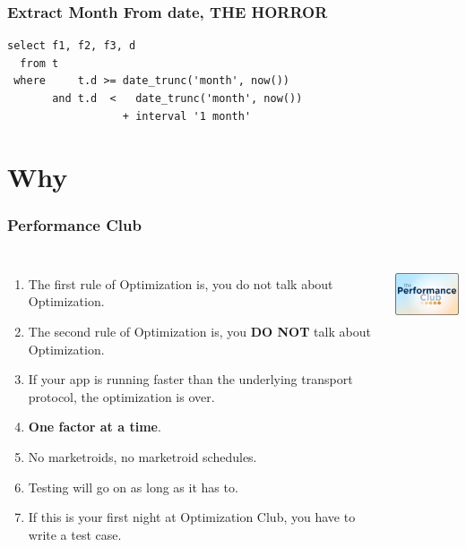 \documentclass{beamer}
\begin{document}
\begin{frame}[fragile]
  \frametitle{Extract Month From date, THE HORROR}

  \vfill

\begin{verbatim}
select f1, f2, f3, d
  from t
 where     t.d >= date_trunc('month', now())
       and t.d  <   date_trunc('month', now())
                  + interval '1 month'
\end{verbatim}
\end{frame}

\section{Why}

\begin{frame}[fragile]
  \frametitle{Performance Club}

  \vfill

\begin{columns}[c]

  \begin{enumerate}
  \item<1-> The first rule of Optimization is, you do not talk about Optimization.
  \item<1-> The second rule of Optimization is, you \textbf{DO NOT} talk about
    Optimization.
  \item<2-> If your app is running faster than the underlying transport
    protocol, the optimization is over.
  \item<2-> \textbf{One factor at a time}.
  \item<2-> No marketroids, no marketroid schedules.
  \item<2-> Testing will go on as long as it has to.
  \item<2-> If this is your first night at Optimization Club, you have to
    write a test case.
  \end{enumerate}

\begin{center}
  \includegraphics[height=5em]{performanceClubPromo.jpg}
\end{center}
\end{columns}
\end{frame}
\end{document}
